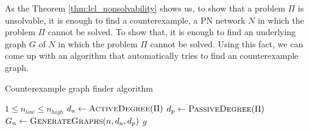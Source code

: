 As the Theorem \ref{thm:lcl_nonsolvability} shows us, to show that a problem $\Pi$ is unsolvable, it is enough to find a counterexample, a PN network $N$ in which the problem $\Pi$ cannot be solved.
To show that, it is enough to find an underlying graph $G$ of $N$ in which the problem $\Pi$ cannot be solved.
Using this fact, we can come up with an algorithm that automatically tries to find an counterexample graph.

\begin{algorithm}[H]
    \caption{Counterexample graph finder algorithm}
    \label{alg:counterexample_finder}
    \begin{algorithmic}[1] %
        \Require $1 \leq n_{low} \leq n_{high}$
          \label{alg:counterexample_finder:n_loop}
            \State $d_a \gets \textsc{ActiveDegree}(\Pi)$ \label{alg:counterexample_finder:d_a}
            \State $d_p \gets \textsc{PassiveDegree}(\Pi)$ \label{alg:counterexample_finder:d_p}
              \label{alg:counterexample_finder:n}
                \State $G_n \gets \textsc{GenerateGraphs}(n, d_a, d_p)$ \label{alg:counterexample_finder:Gn}
                 \label{alg:counterexample_finder:g}
                     \label{alg:counterexample_finder:is_unsolvable}
                        \State \Return $g$ \label{alg:counterexample_finder:return_g}
                    \EndIf
                \EndFor
            \EndFor
            \State \Return {} \label{alg:counterexample_finder:return_nothing}
        \EndFunction
    \end{algorithmic}
\end{algorithm}

